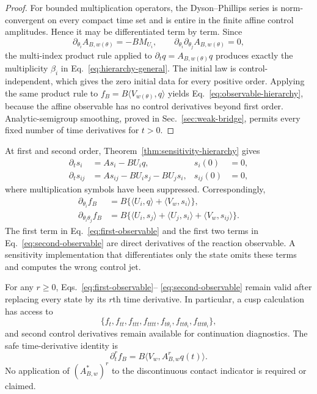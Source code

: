 \documentclass[aps,physrev,onecolumn,amsmath,amssymb,longbibliography]{revtex4-2}
\begin{document}
\begin{proof}
For bounded multiplication operators, the Dyson--Phillips series is
norm-convergent on every compact time set and is entire in the finite affine
control amplitudes.  Hence it may be differentiated term by term.  Since
\begin{equation}
 \partial_{\theta_i}A_{B,w(\theta)}=-BM_{U_i},
 \qquad
 \partial_{\theta_i}\partial_{\theta_j}A_{B,w(\theta)}=0,
 \label{eq:affine-generator-derivatives}
\end{equation}
the multi-index product rule applied to
\(\partial_tq=A_{B,w(\theta)}q\) produces exactly the multiplicity
\(\beta_i\) in Eq.~\eqref{eq:hierarchy-general}.  The initial law is
control-independent, which gives the zero initial data for every positive
order.  Applying the same product rule to
\(f_B=B\langle V_{w(\theta)},q\rangle\) yields
Eq.~\eqref{eq:observable-hierarchy}, because the affine observable has no
control derivatives beyond first order.  Analytic-semigroup smoothing, proved
in Sec.~\ref{sec:weak-bridge}, permits every fixed number of time derivatives
for \(t>0\).
\end{proof}

At first and second order, Theorem~\ref{thm:sensitivity-hierarchy} gives
\begin{align}
 \partial_ts_i&=As_i-BU_iq,&s_i(0)&=0,
 \label{eq:first-sensitivity}\\
 \partial_ts_{ij}&=As_{ij}-BU_is_j-BU_js_i,&s_{ij}(0)&=0,
 \label{eq:second-sensitivity}
\end{align}
where multiplication symbols have been suppressed.  Correspondingly,
\begin{align}
 \partial_{\theta_i}f_B
 &=B\{\langle U_i,q\rangle+\langle V_w,s_i\rangle\},
 \label{eq:first-observable}\\
 \partial_{\theta_i\theta_j}f_B
 &=B\{\langle U_i,s_j\rangle+\langle U_j,s_i\rangle
       +\langle V_w,s_{ij}\rangle\}.
 \label{eq:second-observable}
\end{align}
The first term in Eq.~\eqref{eq:first-observable} and the first two terms in
Eq.~\eqref{eq:second-observable} are direct derivatives of the reaction
observable.  A sensitivity implementation that differentiates only the state
omits these terms and computes the wrong control jet.

For any \(r\ge0\), Eqs.~\eqref{eq:first-observable}--
\eqref{eq:second-observable} remain valid after replacing every state by its
\(r\)th time derivative.  In particular, a cusp calculation has access to
\begin{equation}
 \{f_t,f_{tt},f_{ttt},f_{tttt},
 f_{t\theta_i},f_{tt\theta_i},f_{ttt\theta_i}\},
 \label{eq:cusp-jet}
\end{equation}
and second control derivatives remain available for continuation diagnostics.
The safe time-derivative identity is
\begin{equation}
 \partial_t^rf_B=B\langle V_w,A_{B,w}^rq(t)\rangle.
 \label{eq:safe-time-derivative}
\end{equation}
No application of \((A_{B,w}^*)^r\) to the discontinuous contact indicator is
required or claimed.
\end{document}
